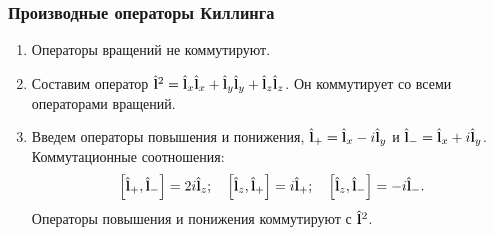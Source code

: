 \documentclass{beamer}
\begin{document}
    \begin{frame}\frametitle{Производные операторы Киллинга}

        \begin{enumerate}
            \item Операторы вращений не коммутируют.

            \item Составим оператор $\hat{\mathbf{l}}^2 = \hat{\mathbf{l}}_x \hat{\mathbf{l}}_x + \hat{\mathbf{l}}_y \hat{\mathbf{l}}_y + \hat{\mathbf{l}}_z \hat{\mathbf{l}}_z$. Он коммутирует со всеми операторами вращений.

            \item Введем операторы повышения и понижения, $\hat{\mathbf{l}}_{+} = \hat{\mathbf{l}}_x - i\hat{\mathbf{l}}_y$ и $\hat{\mathbf{l}}_{-} = \hat{\mathbf{l}}_x + i\hat{\mathbf{l}}_y$. Коммутационные соотношения:
            \begin{equation}
                \left[ \hat{\mathbf{l}}_{+}, \hat{\mathbf{l}}_{-} \right] = 2 i \hat{\mathbf{l}}_{z} ; \quad
                \left[ \hat{\mathbf{l}}_{z}, \hat{\mathbf{l}}_{+} \right] =   i \hat{\mathbf{l}}_{+} ; \quad
                \left[ \hat{\mathbf{l}}_{z}, \hat{\mathbf{l}}_{-} \right] = - i \hat{\mathbf{l}}_{-} .
            \end{equation}
            Операторы повышения и понижения коммутируют с $\hat{\mathbf{l}}^2$.
        \end{enumerate}

    \end{frame}

\end{document}
